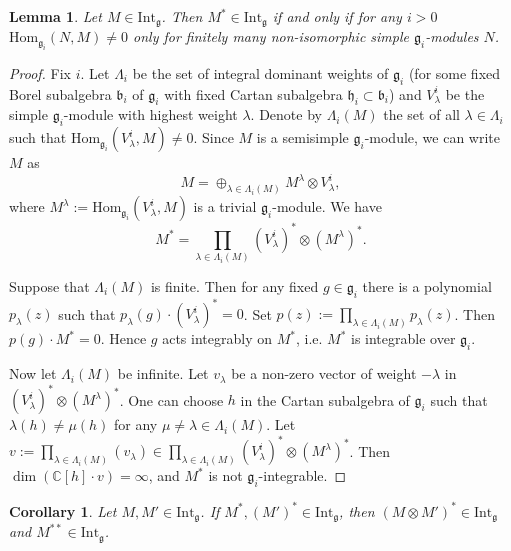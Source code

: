 \documentclass{birkmult}
\newcounter{theorem}
\newtheorem{lemma}[theo]{Lemma}
\newtheorem{corollary}[theo]{Corollary}
\newcommand {\CC} {\mathbb {C}}
\newcommand{\hh}{\mathfrak{h}}
\renewcommand{\gg}{\mathfrak{g}}
\newcommand{\bb}{\mathfrak{b}}
\newcommand{\Int}{\mathrm{Int}}
\renewcommand{\hom}{\mathrm{Hom}}
\begin{document}
\begin{lemma}\label{crit} Let $M\in\Int_\gg$. Then $M^*\in\Int_\gg$ if and
  only if for any $i>0$ $\hom_{\gg_i}(N,M)\neq 0$ only for finitely
  many non-isomorphic simple $\gg_i$-modules $N$.
\end{lemma}
\begin{proof} Fix $i$.
Let $\Lambda_i$ be the set of integral dominant weights of $\gg_i$
(for some fixed Borel subalgebra $\bb_i$ of $\gg_i$ with fixed
Cartan subalgebra $\hh_i\subset\bb_i$)
  and $V_{\lambda}^i$ be the simple $\gg_i$-module with highest weight
  $\lambda$.
Denote by $\Lambda_i(M)$ the set of all $\lambda\in\Lambda_i$
  such that $\hom_{\gg_i}(V_{\lambda}^i,M)\neq 0$. Since
  $M$ is a semisimple $\gg_i$-module, we can write $M$ as
\[
M=\oplus_{\lambda\in\Lambda_i(M)} M^\lambda\otimes V_{\lambda}^i,
\]
where $M^\lambda:=\hom_{\gg_i}(V_{\lambda}^i,M)$ is a trivial
$\gg_i$-module. We have
\[
M^*=\prod_{\lambda\in\Lambda_i(M)} (V_{\lambda}^i)^*\otimes
(M^\lambda)^*.
\]

Suppose that $\Lambda_i(M)$ is finite. Then for any fixed
$g\in\gg_i$ there is a polynomial $p_\lambda(z)$ such that
$p_\lambda(g)\cdot (V_{\lambda}^i)^*=0$. Set
$p(z):=\prod_{\lambda\in\Lambda_i(M)}p_\lambda(z)$. Then
$p(g)\cdot M^*=0$. Hence $g$ acts integrably on $M^{*}$, i.e.
$M^*$ is integrable over $\gg_i$.

Now let $\Lambda_i(M)$ be infinite. Let $v_\lambda$ be a non-zero
vector of weight $-\lambda$ in $(V_{\lambda}^i)^*\otimes
(M^\lambda)^*$. One can choose $h$ in the Cartan subalgebra of
$\gg_i$ such that $\lambda(h)\neq\mu(h)$ for any
$\mu\neq\lambda\in\Lambda_i(M)$. Let
$v:=\prod_{\lambda\in\Lambda_i(M)}(v_\lambda)\in
\prod_{\lambda\in\Lambda_i(M)}
(V_{\lambda}^i)^*\otimes(M^\lambda)^*$. Then $\dim(\CC[h]\cdot
v)=\infty$, and $M^*$ is not $\gg_i$-integrable. \end{proof}


\begin{corollary}\label{tendual} Let $M,M'\in\Int_\gg$. If
  $M^*,(M')^*\in\Int_\gg$, then $(M\otimes M')^*\in \Int_\gg$ and $M^{**}\in\Int_\gg$.
\end{corollary}
\end{document}
